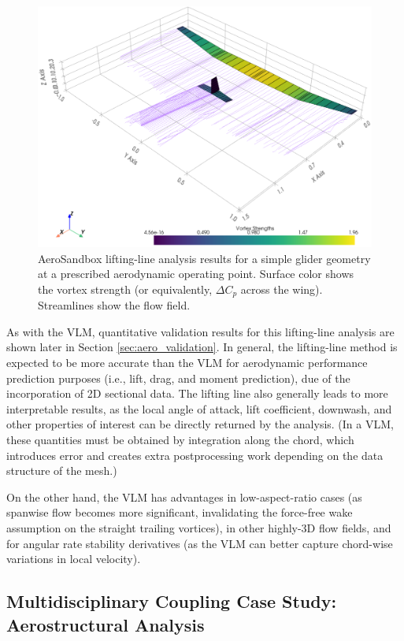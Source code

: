 \begin{figure}[H]
    \centering
    \includegraphics[width=\textwidth]{../figures/ll.png}
    \caption{AeroSandbox lifting-line analysis results for a simple glider geometry at a prescribed aerodynamic operating point. Surface color shows the vortex strength (or equivalently, $\Delta C_p$ across the wing). Streamlines show the flow field.}
    \label{fig:ll}
\end{figure}

As with the VLM, quantitative validation results for this lifting-line analysis are shown later in Section \ref{sec:aero_validation}. In general, the lifting-line method is expected to be more accurate than the VLM for aerodynamic performance prediction purposes (i.e., lift, drag, and moment prediction), due of the incorporation of 2D sectional data. The lifting line also generally leads to more interpretable results, as the local angle of attack, lift coefficient, downwash, and other properties of interest can be directly returned by the analysis. (In a VLM, these quantities must be obtained by integration along the chord, which introduces error and creates extra postprocessing work depending on the data structure of the mesh.)

On the other hand, the VLM has advantages in low-aspect-ratio cases (as spanwise flow becomes more significant, invalidating the force-free wake assumption on the straight trailing vortices), in other highly-3D flow fields, and for angular rate stability derivatives (as the VLM can better capture chord-wise variations in local velocity).

\subsection{Multidisciplinary Coupling Case Study: Aerostructural Analysis}

